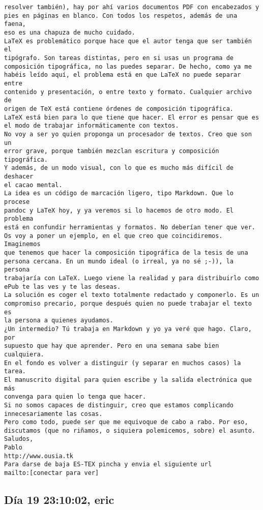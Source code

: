 \documentclass[a4paper,10pt]{article}
\begin{document}
\begin{lstlisting}
resolver también), hay por ahí varios documentos PDF con encabezados y
pies en páginas en blanco. Con todos los respetos, además de una faena,
eso es una chapuza de mucho cuidado.
LaTeX es problemático porque hace que el autor tenga que ser también el
tipógrafo. Son tareas distintas, pero en si usas un programa de
composición tipográfica, no las puedes separar. De hecho, como ya me
habéis leído aquí, el problema está en que LaTeX no puede separar entre
contenido y presentación, o entre texto y formato. Cualquier archivo de
origen de TeX está contiene órdenes de composición tipográfica.
LaTeX está bien para lo que tiene que hacer. El error es pensar que es
el modo de trabajar informáticamente con textos.
No voy a ser yo quien proponga un procesador de textos. Creo que son un
error grave, porque también mezclan escritura y composición tipográfica.
Y además, de un modo visual, con lo que es mucho más difícil de deshacer
el cacao mental.
La idea es un código de marcación ligero, tipo Markdown. Que lo procese
pandoc y LaTeX hoy, y ya veremos si lo hacemos de otro modo. El problema
está en confundir herramientas y formatos. No deberían tener que ver.
Os voy a poner un ejemplo, en el que creo que coincidiremos. Imaginemos
que tenemos que hacer la composición tipográfica de la tesis de una
persona cercana. En un mundo ideal (o irreal, ya no sé ;-)), la persona
trabajaría con LaTeX. Luego viene la realidad y para distribuirlo como
ePub te las ves y te las deseas.
La solución es coger el texto totalmente redactado y componerlo. Es un
compromiso precario, porque después quien no puede trabajar el texto es
la persona a quienes ayudamos.
¿Un intermedio? Tú trabaja en Markdown y yo ya veré que hago. Claro, por
supuesto que hay que aprender. Pero en una semana sabe bien cualquiera.
En el fondo es volver a distinguir (y separar en muchos casos) la tarea.
El manuscrito digital para quien escribe y la salida electrónica que más
convenga para quien lo tenga que hacer.
Si no somos capaces de distinguir, creo que estamos complicando
innecesariamente las cosas.
Pero como todo, puede ser que me equivoque de cabo a rabo. Por eso,
discutamos (que no riñamos, o siquiera polemicemos, sobre) el asunto.
Saludos,
Pablo
http://www.ousia.tk
Para darse de baja ES-TEX pincha y envia el siguiente url
mailto:[conectar para ver]

\end{lstlisting}

\subsection{Día 19 23:10:02, eric}
\end{document}
